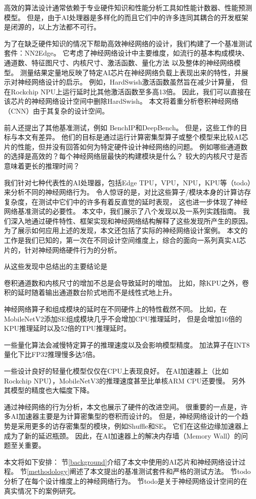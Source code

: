 高效的算法设计通常依赖于专业硬件知识和性能分析工具如性能计数器、性能预测模型。
但是，由于AI处理器是多样化的而且它们中的许多连同其耦合的开发框架是闭源的，以上方法都不可行。

为了在缺乏硬件知识的情况下帮助高效神经网络的设计，我们构建了一个基准测试套件：NN2Edge。
它考虑了神经网络设计中主要维度，如流行的基本构成模块、通道数、特征图尺寸、内核尺寸、激活函数、量化方法
以及整体的神经网络模型。
测量结果定量地反映了特定AI芯片在神经网络负载上表现出来的特性，并展示对神经网络设计的启示。
例如，HardSwish\cite{howard2019searching}激活函数虽然旨在减少计算量，
但在Rockchip NPU\cite{rk3399pro}上运行延时比其他激活函数至多高13倍。
因此，我们可以直接在该芯片的神经网络设计空间中删除HardSwish。
本文将着重分析卷积神经网络（CNN）由于其复杂的设计空间。

前人还提出了其他基准测试，例如
BenchIP\cite{tao2017benchip}和DeepBench\cite{deepbench}。
但是，这些工作的目标与本文有差异。
他们的目标是通过运行计算密集型算子或整个模型来比较AI芯片的性能，但并没有回答如何为特定硬件设计神经网络的问题。
例如哪些通道数的选择是高效的？每个神经网络层最快的构建模块是什么？
较大的内核尺寸是否意味着更长的推理时间？

我们针对七种代表性的AI处理器，包括Edge TPU，VPU，NPU，KPU等（todo）来分析不同的神经网络行为。
令人惊讶的是，对比这些算子/模块本身的计算访存复杂度，在测试中它们中的许多有着反直觉的延时表现，
这也进一步体现了神经网络基准测试的必要性。
本文中，我们展示了八个发现以及一系列实践指南。
我们深入地通过硬件特性、框架实现和神经网络结构解释了这些发现所产生的原因。
为了展示如何应用上述的发现，本文还包括了实际的神经网络设计案例。
本文的工作是我们已知的，第一次在不同设计空间维度上，综合的面向一系列真实AI芯片的，针对神经网络硬件行为的分析。

从这些发现中总结出的主要结论是
\begin{enumerate*}
    \item 卷积通道数和内核尺寸的增加不总是会导致延时的增加。
    比如，除KPU之外，卷积的延时随着输出通道数台阶式地而不是线性式地上升。
    \item 神经网络算子和组成模块的延时在不同硬件上的特性截然不同。
    比如，在MobileNetV2添加SE\cite{hu2018squeeze}组成模块几乎不会增加CPU推理延时，
    但是会增加16倍的KPU推理延时以及52倍的TPU推理延时。
    \item 一些量化算法会减慢特定算子的推理速度以及会影响模型精度。
    加法算子在INT8量化下比FP32推理慢多达5倍。
    \item 一些设计良好的轻量化模型仅仅在CPU上表现良好。
    在AI加速器上（比如Rockchip NPU），MobileNetV3的推理速度甚至比单核ARM CPU还要慢。
    另外其模型的精度也大幅度下降。
\end{enumerate*}

通过神经网络的行为分析，本文也展示了硬件的改进空间。
很重要的一点是，许多AI加速器主要是为计算密集型的卷积而设计的。
但是，神经网络设计的一个趋势是采用更多的访存密集型的模块，例如Shuffle和SE。
它们在这些边缘加速器上成为了新的延迟瓶颈。
因此，在AI加速器上的解决内存墙（Memory Wall）的问题至关重要。

本文将如下安排：
节\ref{background}介绍了本文中使用的AI芯片和神经网络设计过程。
节\ref{methodology}阐述了本文提出的基准测试套件和严格的测试方法。
节todo分析了在每个设计维度上的神经网络行为。
节todo是关于神经网络设计空间的在真实情况下的案例研究。
